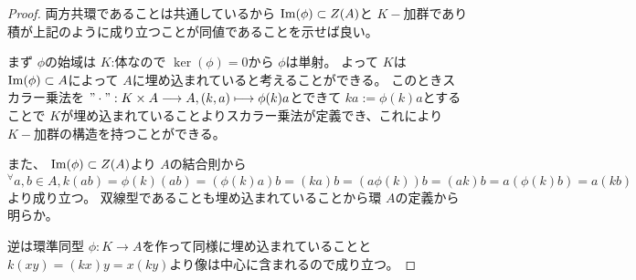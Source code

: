 \documentclass[../master_galois_theory]{subfiles}
\begin{document}
\begin{proof}
  両方共環であることは共通しているから $\mathrm{Im}(\phi) \subset Z(A)$と $K-$加群であり積が上記のように成り立つことが同値であることを示せば良い。

  まず $\phi$の始域は $K$:体なので $\ker(\phi) = 0$から $\phi$は単射。
  よって $K$は $\mathrm{Im}(\phi) \subset A$によって $A$に埋め込まれていると考えることができる。
  このときスカラー乗法を $" \cdot " : K \times A \longrightarrow A , (k , a) \longmapsto \phi(k)a$とできて $ka := \phi(k)a$とすることで $K$が埋め込まれていることよりスカラー乗法が定義でき、これにより $K-$加群の構造を持つことができる。

  また、 $\mathrm{Im}(\phi) \subset Z(A)$より $A$の結合則から ${}^\forall a , b \in A , k(ab) = \phi(k)(ab) = (\phi(k)a)b = (ka)b = (a\phi(k))b = (ak)b = a(\phi(k)b) = a(kb)$より成り立つ。
  双線型であることも埋め込まれていることから環 $A$の定義から明らか。

  逆は環準同型 $\phi : K \longrightarrow A$を作って同様に埋め込まれていることと $k(xy) = (kx)y = x(ky)$より像は中心に含まれるので成り立つ。
\end{proof}
\end{document}
